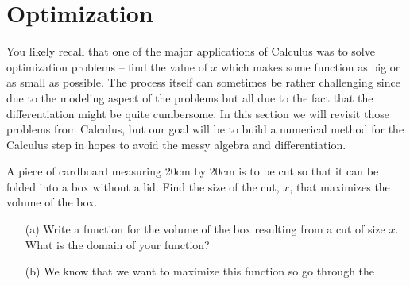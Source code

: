 \newpage\section{Optimization}
You likely recall that one of the major applications of Calculus was to solve optimization
problems -- find the value of $x$ which makes some function as big or as small as
possible.  The process itself can sometimes be rather challenging since due to the
modeling aspect of the problems but all due to the fact that the differentiation might be
quite cumbersome.  In this section we will revisit those problems from Calculus, but our
goal will be to build a numerical method for the Calculus step in hopes to avoid the messy
algebra and differentiation.

\begin{problem}\label{prob:cardboard}
    A piece of cardboard measuring 20cm by 20cm is to be cut so that it can be folded into
    a box without a lid. Find the size of the cut, $x$, that maximizes the volume of the
    box. 
    \begin{center}
    \end{center}
    \begin{enumerate}
        \item[(a)] Write a function for the volume of the box resulting from a cut of size
            $x$.  What is the domain of your function?
        \item[(b)] We know that we want to maximize this function so go through the

\end{enumerate}
\end{problem}
